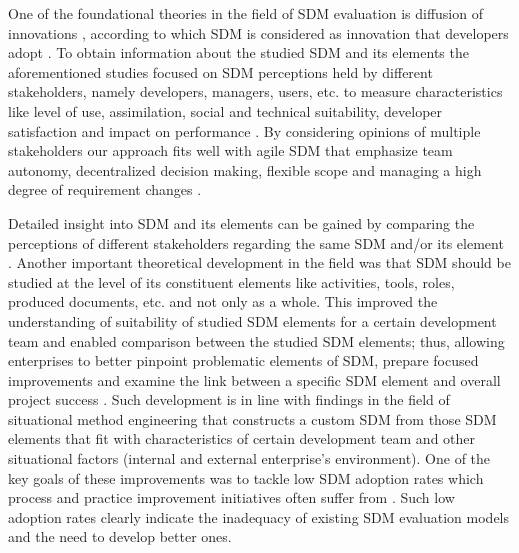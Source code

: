 One of the foundational theories in the field of SDM evaluation is diffusion of innovations \citep{DBLP:books/daglib/0012785}, according to which SDM is considered as innovation that developers adopt \citep{DBLP:journals/iam/Gallivan03,DBLP:journals/infsof/GreenHC05,Huisman2002}. To obtain information about the studied SDM and its elements the aforementioned studies focused on SDM perceptions held by different stakeholders, namely developers, managers, users, etc. to measure characteristics like level of use, assimilation, social and technical suitability, developer satisfaction and impact on performance \citep{atkinson1999project,cooper1990information,DBLP:books/daglib/0012785,DBLP:journals/infsof/VavpoticB09,DBLP:journals/comsis/VavpoticH12,DBLP:journals/infsof/HodaNM11}. By considering opinions of multiple
stakeholders our approach fits well with agile SDM that emphasize team autonomy, decentralized
decision making, flexible scope and managing a high degree of requirement changes \citep{DBLP:journals/smr/ScottMKP21,DBLP:journals/software/Jorgensen19}.


Detailed insight into SDM and its elements can be gained by comparing the perceptions of different stakeholders regarding the same SDM and/or its element \citep{hovelja2015exploring}. 
Another important theoretical development in the field was that SDM should be studied at the level of its constituent elements like activities, tools, roles, produced documents, etc. and not only as a whole. This improved the understanding of suitability of studied SDM elements for a certain development team and enabled comparison between the studied SDM elements; thus, allowing enterprises to better pinpoint problematic elements of SDM, prepare focused improvements and examine the link between a specific SDM element and overall project success \citep{atkinson1999project,hovelja2015exploring}. Such development is in line with findings in the field of situational method engineering \citep{DBLP:journals/ejis/KarlssonA09,DBLP:conf/caise/RalyteDR03,gill2018scaling} that constructs a custom SDM from those SDM elements that fit with characteristics of certain development team and other situational factors (internal and external enterprise’s environment).
One of the key goals of these improvements was to tackle low SDM
adoption rates which process and practice improvement initiatives often suffer from \citep{DBLP:conf/profes/FontdevilaGOP19}. Such low adoption rates clearly indicate the inadequacy of existing
SDM evaluation models and the need to develop better ones.

